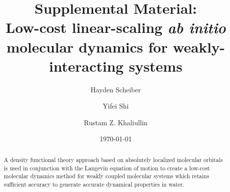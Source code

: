 \documentclass[aps,prl,reprint,amsmath,amssymb]{revtex4-1}
\newcommand*{\MAINTEXT}{}
\begin{document}
\ifdefined\MAINTEXT
\else
	\clearpage
	\widetext
	\setcounter{figure}{0}
	\setcounter{page}{1}
	\renewcommand{\thefigure}{S\arabic{figure}}
\fi

\title{
\ifdefined\MAINTEXT
\else
Supplemental Material: \\
\fi
Low-cost linear-scaling \emph{ab initio} molecular dynamics for weakly-interacting systems
}

\author{Hayden Scheiber}
\author{Yifei Shi}
\author{Rustam Z. Khaliullin}

\date{\today}

\ifdefined\MAINTEXT

\begin{abstract}
A density functional theory approach based on absolutely localized molecular orbitals is used in conjunction with the Langevin equation of motion to create a low-cost molecular dynamics method for weakly coupled molecular systems which retains sufficient accuracy to generate accurate dynamical properties in water. 



\end{abstract}
\end{document}
